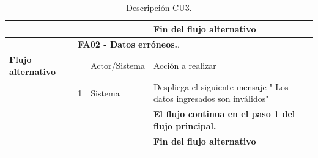 \begin{longtable}[H]{| p{} | p{} |p{4cm}|p{5cm}|}
     \hline
     & & & \textbf{Fin del flujo alternativo}\\
     \hline
     & \multicolumn{3}{|l|}{\textbf{FA02 - Datos erróneos.}.}\\
     \hline
     \textbf{Flujo alternativo} & & Actor/Sistema & Acción a realizar\\
     \hline
     & 1 & Sistema & Despliega el siguiente mensaje " Los datos ingresados son inválidos"\\
     \hline
     & & & \textbf{El flujo continua en el paso 1 del flujo principal.}\\
     \hline
     & & & \textbf{Fin del flujo alternativo}\\
     \hline
    \caption{Descripción CU3.}
    \label{tabla:CU3}
\end{longtable}



